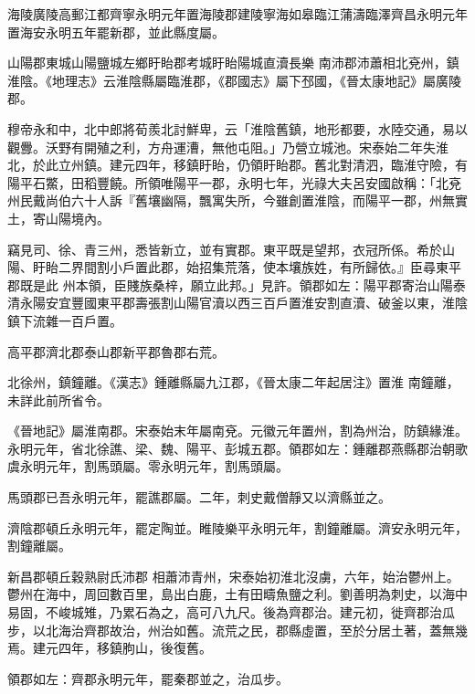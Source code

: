 \begin{pinyinscope}
 海陵廣陵高郵江都齊寧永明元年置海陵郡建陵寧海如皋臨江蒲濤臨澤齊昌永明元年置海安永明五年罷新郡，並此縣度屬。



 山陽郡東城山陽鹽城左鄉盱眙郡考城盱眙陽城直瀆長樂
 南沛郡沛蕭相北兗州，鎮淮陰。《地理志》云淮陰縣屬臨淮郡，《郡國志》屬下邳國，《晉太康地記》屬廣陵郡。



 穆帝永和中，北中郎將荀羨北討鮮卑，云「淮陰舊鎮，地形都要，水陸交通，易以觀釁。沃野有開殖之利，方舟運漕，無他屯阻。」乃營立城池。宋泰始二年失淮北，於此立州鎮。建元四年，移鎮盱眙，仍領盱眙郡。舊北對清泗，臨淮守險，有陽平石鱉，田稻豐饒。所領唯陽平一郡，永明七年，光祿大夫呂安國啟稱：「北兗州民戴尚伯六十人訴『舊壤幽隔，飄寓失所，今雖創置淮陰，而陽平一郡，州無實土，寄山陽境內。



 竊見司、徐、青三州，悉皆新立，並有實郡。東平既是望邦，衣冠所係。希於山陽、盱眙二界間割小戶置此郡，始招集荒落，使本壤族姓，有所歸依。』臣尋東平郡既是此
 州本領，臣賤族桑梓，願立此邦。」見許。領郡如左：陽平郡寄治山陽泰清永陽安宜豐國東平郡壽張割山陽官瀆以西三百戶置淮安割直瀆、破釜以東，淮陰鎮下流雜一百戶置。



 高平郡濟北郡泰山郡新平郡魯郡右荒。



 北徐州，鎮鐘離。《漢志》鍾離縣屬九江郡，《晉太康二年起居注》置淮
 南鐘離，未詳此前所省令。



 《晉地記》屬淮南郡。宋泰始末年屬南兗。元徽元年置州，割為州治，防鎮緣淮。永明元年，省北徐譙、梁、魏、陽平、彭城五郡。領郡如左：鍾離郡燕縣郡治朝歌虞永明元年，割馬頭屬。零永明元年，割馬頭屬。



 馬頭郡已吾永明元年，罷譙郡屬。二年，刺史戴僧靜又以濟縣並之。



 濟陰郡頓丘永明元年，罷定陶並。睢陵樂平永明元年，割鐘離屬。濟安永明元年，割鐘離屬。



 新昌郡頓丘穀熟尉氏沛郡
 相蕭沛青州，宋泰始初淮北沒虜，六年，始治鬱州上。鬱州在海中，周回數百里，島出白鹿，土有田疇魚鹽之利。劉善明為刺史，以海中易固，不峻城雉，乃累石為之，高可八九尺。後為齊郡治。建元初，徙齊郡治瓜步，以北海治齊郡故治，州治如舊。流荒之民，郡縣虛置，至於分居土著，蓋無幾焉。建元四年，移鎮朐山，後復舊。



 領郡如左：齊郡永明元年，罷秦郡並之，治瓜步。




\end{pinyinscope}
